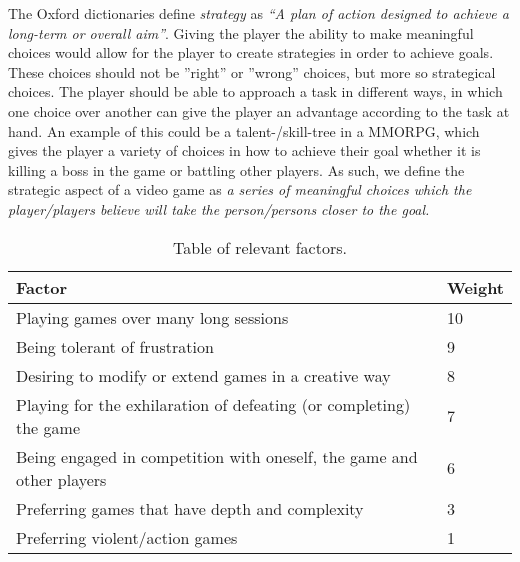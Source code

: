 The Oxford dictionaries define \textit{strategy} as \textit{``A plan of action designed to achieve a long-term or overall aim''}.\cite{strategyOx}
Giving the player the ability to make meaningful choices would allow for the player to create strategies in order to achieve goals.
These choices should not be ''right'' or ''wrong'' choices, but more so strategical choices. The player should be able to approach a task in different ways, in which one choice over another can give the player an advantage according to the task at hand. 
An example of this could be a talent-/skill-tree in a MMORPG, which gives the player a variety of choices in how to achieve their goal whether it is killing a boss in the game or battling other players.
As such, we define the strategic aspect of a video game as \emph{a series of meaningful choices which the player/players believe will take the person/persons closer to the goal.}

\begin{table}[h]
\begin{tabular}{|l|l|}
\hline
\rowcolor[HTML]{C0C0C0} 
Factor                                                                & Weight  \\ \hline
Playing games over many long sessions                                 & 10     	\\ \hline
Being tolerant of frustration                                         & 9       \\ \hline
Desiring to modify or extend games in a creative way                  & 8       \\ \hline
Playing for the exhilaration of defeating (or completing) the game    & 7       \\ \hline
Being engaged in competition with oneself, the game and other players & 6       \\ \hline
Preferring games that have depth and complexity                       & 3       \\ \hline
Preferring violent/action games                                       & 1       \\ \hline
\end{tabular}
\caption{Table of relevant factors.}
\label{tab:relevantFactors}
\end{table}